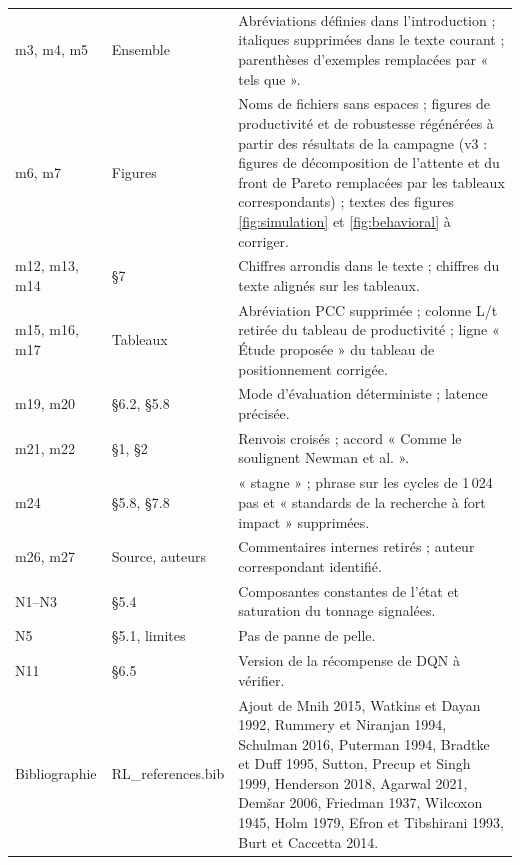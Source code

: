 \documentclass[11pt,a4paper]{article}
\begin{document}
\begin{longtable}{p{2.2cm}p{4.3cm}p{8.6cm}}
m3, m4, m5 & Ensemble & Abréviations définies dans l'introduction ; italiques supprimées dans le texte courant ; parenthèses d'exemples remplacées par « tels que ». \\
m6, m7 & Figures & Noms de fichiers sans espaces ; figures de productivité et de robustesse régénérées à partir des résultats de la campagne (v3 : figures de décomposition de l'attente et du front de Pareto remplacées par les tableaux correspondants) ; textes des figures \ref{fig:simulation} et \ref{fig:behavioral} à corriger. \\
m12, m13, m14 & §7 & Chiffres arrondis dans le texte ; chiffres du texte alignés sur les tableaux. \\
m15, m16, m17 & Tableaux & Abréviation PCC supprimée ; colonne L/t retirée du tableau de productivité ; ligne « Étude proposée » du tableau de positionnement corrigée. \\
m19, m20 & §6.2, §5.8 & Mode d'évaluation déterministe ; latence précisée. \\
m21, m22 & §1, §2 & Renvois croisés ; accord « Comme le soulignent Newman et al. ». \\
m24 & §5.8, §7.8 & « stagne » ; phrase sur les cycles de 1\,024 pas et « standards de la recherche à fort impact » supprimées. \\
m26, m27 & Source, auteurs & Commentaires internes retirés ; auteur correspondant identifié. \\
N1--N3 & §5.4 & Composantes constantes de l'état et saturation du tonnage signalées. \\
N5 & §5.1, limites & Pas de panne de pelle. \\
N11 & §6.5 & Version de la récompense de DQN à vérifier. \\
Bibliographie & RL\_references.bib & Ajout de Mnih 2015, Watkins et Dayan 1992, Rummery et Niranjan 1994, Schulman 2016, Puterman 1994, Bradtke et Duff 1995, Sutton, Precup et Singh 1999, Henderson 2018, Agarwal 2021, Demšar 2006, Friedman 1937, Wilcoxon 1945, Holm 1979, Efron et Tibshirani 1993, Burt et Caccetta 2014. \\
\bottomrule
\end{longtable}
\normalsize
\fi
\end{document}
